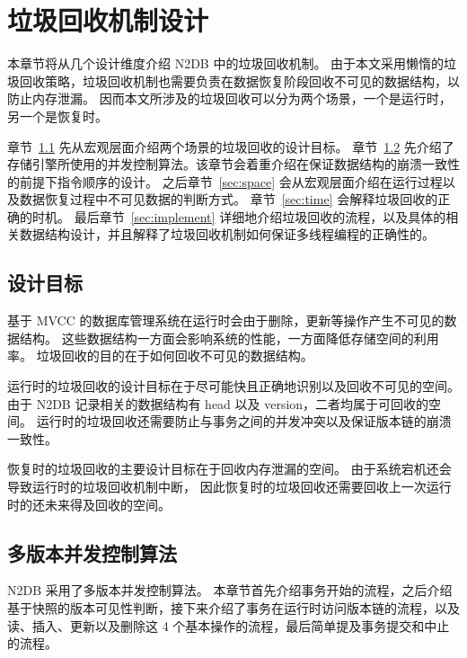 
\chapter{垃圾回收机制设计}

本章节将从几个设计维度介绍 N2DB 中的垃圾回收机制。
由于本文采用懒惰的垃圾回收策略，垃圾回收机制也需要负责在数据恢复阶段回收不可见的数据结构，以防止内存泄漏。
因而本文所涉及的垃圾回收可以分为两个场景，一个是运行时，另一个是恢复时。

章节~\ref{sec:gc-goal} 先从宏观层面介绍两个场景的垃圾回收的设计目标。
章节~\ref{sec:mvcc} 先介绍了存储引擎所使用的并发控制算法。该章节会着重介绍在保证数据结构的崩溃一致性的前提下指令顺序的设计。
之后章节~\ref{sec:space} 会从宏观层面介绍在运行过程以及数据恢复过程中不可见数据的判断方式。
章节~\ref{sec:time} 会解释垃圾回收的正确的时机。
最后章节~\ref{sec:implement} 详细地介绍垃圾回收的流程，以及具体的相关数据结构设计，并且解释了垃圾回收机制如何保证多线程编程的正确性的。


\section{设计目标}
\label{sec:gc-goal}

基于 MVCC 的数据库管理系统在运行时会由于删除，更新等操作产生不可见的数据结构。
这些数据结构一方面会影响系统的性能，一方面降低存储空间的利用率。
垃圾回收的目的在于如何回收不可见的数据结构。

运行时的垃圾回收的设计目标在于尽可能快且正确地识别以及回收不可见的空间。
由于 N2DB 记录相关的数据结构有 head 以及 version，二者均属于可回收的空间。
运行时的垃圾回收还需要防止与事务之间的并发冲突以及保证版本链的崩溃一致性。

恢复时的垃圾回收的主要设计目标在于回收内存泄漏的空间。
由于系统宕机还会导致运行时的垃圾回收机制中断，
因此恢复时的垃圾回收还需要回收上一次运行时的还未来得及回收的空间。


\section{多版本并发控制算法}
\label{sec:mvcc}
N2DB 采用了多版本并发控制算法。
本章节首先介绍事务开始的流程，之后介绍基于快照的版本可见性判断，接下来介绍了事务在运行时访问版本链的流程，以及读、插入、更新以及删除这 4 个基本操作的流程，最后简单提及事务提交和中止的流程。

